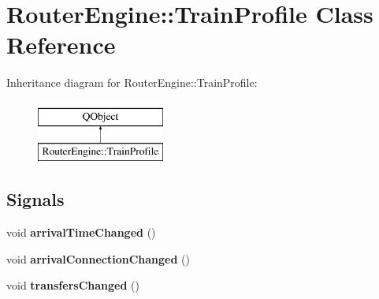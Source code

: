 \hypertarget{classRouterEngine_1_1TrainProfile}{}\section{Router\+Engine\+:\+:Train\+Profile Class Reference}
\label{classRouterEngine_1_1TrainProfile}
Inheritance diagram for Router\+Engine\+:\+:Train\+Profile\+:\begin{figure}[H]
\begin{center}
\leavevmode
\includegraphics[height=2.000000cm]{classRouterEngine_1_1TrainProfile}
\end{center}
\end{figure}
\subsection*{Signals}
\begin{DoxyCompactItemize}
\item 
\mbox{\label{classRouterEngine_1_1TrainProfile_afe0f0d59e98011a26d04182cc6c22f4b}} 
void {\bfseries arrival\+Time\+Changed} ()
\item 
\mbox{\label{classRouterEngine_1_1TrainProfile_ab15c6b13b788f6cceb3ec1ad6be6efc2}} 
void {\bfseries arrival\+Connection\+Changed} ()
\item 
\mbox{\label{classRouterEngine_1_1TrainProfile_a8830ecbd04b1b6e9dae3123687faef87}} 
void {\bfseries transfers\+Changed} ()
\end{DoxyCompactItemize}
